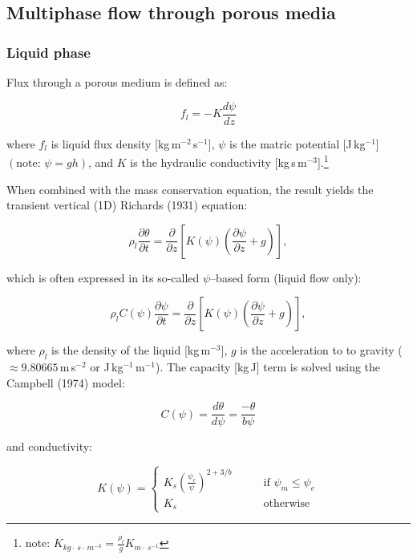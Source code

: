 \documentclass[10pt, letterpapr]{article}
\begin{document}
\subsection*{Multiphase flow through porous media}

\subsubsection*{Liquid phase}

Flux through a porous medium is defined as:

\[
	f_l=-K\frac{d\psi}{dz}
\]

\noindent where $f_l$ is liquid flux density [kg\,m$^{-2}$\,s$^{-1}$], $\psi$ is the matric potential [J\,kg$^{-1}$] $\left(\text{note: }\psi=gh\right)$, and $K$ is the hydraulic conductivity [kg\,s\,m$^{-3}$].\footnote{note: $K_{kg\cdot\,s\cdot\,m^{-3}}=\frac{\rho_l}{g}K_{m\cdot\,s^{-1}}$}

When combined with the mass conservation equation, the result yields the transient vertical (1D) Richards (1931) equation: 


\[
	\rho_l\frac{\partial\theta}{\partial t}=\frac{\partial}{\partial z}\left[K(\psi)\left(\frac{\partial\psi}{\partial z}+g\right)\right],
\]

\noindent which is often expressed in its so-called $\psi$--based form (liquid flow only):

\[
	\rho_lC(\psi)\frac{\partial\psi}{\partial t}=\frac{\partial}{\partial z}\left[K(\psi)\left(\frac{\partial\psi}{\partial z}+g\right)\right],
\]

\noindent where $\rho_l$ is the density of the liquid [kg\,m$^{-3}$], $g$ is the acceleration to to gravity ($\approx9.80665$\,m\,s$^{-2}$ or J\,kg$^{-1}$\,m$^{-1}$). The capacity [kg\,J] term is solved using the Campbell (1974) model: %

\[
	C(\psi)=\frac{d\theta}{d\psi}=\frac{-\theta}{b\psi}
\]

\noindent and conductivity:

\[
	K(\psi)=
	\begin{cases}
		K_s\left(\frac{\psi_e}{\psi}\right)^{2+3/b}  \qquad &\text{if $\psi_m\leq\psi_e$} \\
		K_s  &\text{otherwise}
	\end{cases}
\]
\end{document}
